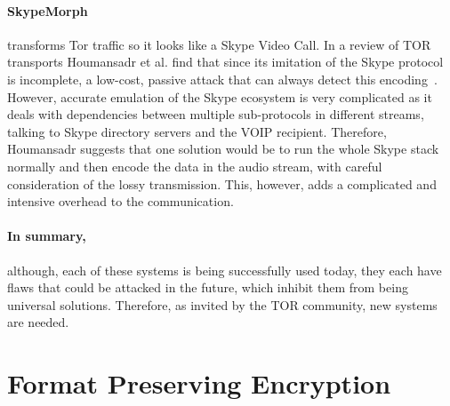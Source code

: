 \documentclass[ %
                    author={Samuel Russell},
                supervisor={Prof. Bogdan Warinschi},
                    degree={MEng},
                     title={Innocuous Ciphertexts},
                  subtitle={The DE-CENSOR Scheme},
                      type={Research},
                      year={2018} ]{dissertation}
\begin{document}
\paragraph{SkypeMorph} transforms Tor traffic so it looks like a Skype Video Call.
In a review of TOR transports Houmansadr et al. find that since its imitation of the Skype protocol is incomplete, a low-cost, passive attack that can always detect this encoding~\cite{parot}.
However, accurate emulation of the Skype ecosystem is very complicated as it deals with dependencies between multiple sub-protocols in different streams, talking to Skype directory servers and the VOIP recipient. Therefore, Houmansadr suggests that one solution would be to run the whole Skype stack normally and then encode the data in the audio stream, with careful consideration of the lossy transmission. This, however, adds a complicated and intensive overhead to the communication.

\paragraph{In summary,} although, each of these systems is being successfully used today, they each have flaws that could be attacked in the future, which inhibit them from being universal solutions. Therefore, as invited by the TOR community, new systems are needed.

%
%



\section{Format Preserving Encryption}
\end{document}

